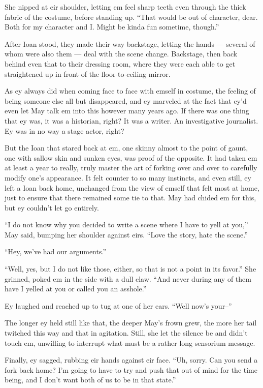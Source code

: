 She nipped at eir shoulder, letting em feel sharp teeth even through the thick fabric of the costume, before standing up. ``That would be out of character, dear. Both for my character and I. Might be kinda fun sometime, though.''

After Ioan stood, they made their way backstage, letting the hands — several of whom were also them — deal with the scene change. Backstage, then back behind even that to their dressing room, where they were each able to get straightened up in front of the floor-to-ceiling mirror.

As ey always did when coming face to face with emself in costume, the feeling of being someone else all but disappeared, and ey marveled at the fact that ey'd even let May talk em into this however many years ago. If there was one thing that ey was, it was a historian, right? It was a writer. An investigative journalist. Ey was in no way a stage actor, right?

But the Ioan that stared back at em, one skinny almost to the point of gaunt, one with sallow skin and sunken eyes, was proof of the opposite. It had taken em at least a year to really, truly master the art of forking over and over to carefully modify one's appearance. It felt counter to so many instincts, and even still, ey left a Ioan back home, unchanged from the view of emself that felt most at home, just to ensure that there remained some tie to that. May had chided em for this, but ey couldn't let go entirely.

``I do not know why you decided to write a scene where I have to yell at you,'' May said, bumping her shoulder against eirs. ``Love the story, hate the scene.''

``Hey, we've had our arguments.''

``Well, yes, but I do not like those, either, so that is not a point in its favor.'' She grinned, poked em in the side with a dull claw. ``And never during any of them have I yelled at you or called you an asshole.''

Ey laughed and reached up to tug at one of her ears. ``Well now's your--''

The longer ey held still like that, the deeper May's frown grew, the more her tail twitched this way and that in agitation. Still, she let the silence be and didn't touch em, unwilling to interrupt what must be a rather long sensorium message.

Finally, ey sagged, rubbing eir hands against eir face. ``Uh, sorry. Can you send a fork back home? I'm going to have to try and push that out of mind for the time being, and I don't want both of us to be in that state.''

